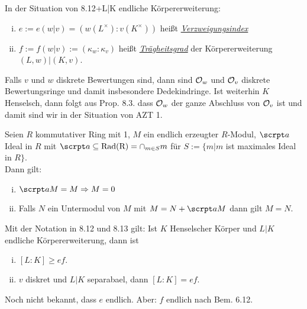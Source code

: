 \begin{defi}
In der Situation von 8.12+L|K endliche Körpererweiterung:
\begin{enumerate}[i)]
\item $e:=e(w|v)=(w(L^\times):v(K^\times))$ heißt \underline{\emph{Verzweigungsindex}}
\item $f:=f(w|v):=(\kappa_w:\kappa_v)$ heißt \underline{\emph{Trägheitsgrad}} der Körpererweiterung $(L,w)|(K,v)$.
\end{enumerate}
\end{defi}

\begin{Bem}
Falls $v$ und $w$ diskrete Bewertungen sind, dann sind $\mathcal{O}_w$ und $\mathcal{O}_v$ diskrete Bewertungsringe und damit insbesondere Dedekindringe. Ist weiterhin $K$ Henselsch, dann folgt aus Prop. 8.3. dass $\mathcal{O}_w$ der ganze Abschluss von $\mathcal{O}_v$ ist und damit sind wir in der Situation von AZT 1.
\end{Bem}

\begin{Fakt}
Seien $R$ kommutativer Ring mit 1, $M$ ein endlich erzeugter $R$-Modul, $\a$ Ideal in $R$ mit $\a \subseteq \mathrm{Rad(R)}=\cap_{m \in S} m$ für $S:=\{m | m  $ ist maximales Ideal in $ R\}$.\\
Dann gilt:
\begin{enumerate}[i)]
\item $\a M=M \Rightarrow M=0$
\item Falls $N$ ein Untermodul von $M$ mit $M=N+\a M$ dann gilt $M=N$.
\end{enumerate}
\end{Fakt}

\begin{Prop}
Mit der Notation in 8.12 und 8.13 gilt: Ist $K$ Henselscher Körper und $L|K$ endliche Körpererweiterung, dann ist
\begin{enumerate}[i)]
\item $[L:K] \geq ef.$
\item $v$ diskret und $L|K$ separabael, dann $[L:K]=ef$.
\end{enumerate}
\danger Noch nicht bekannt, dass $e$ endlich. Aber: $f$ endlich nach Bem. 6.12.
\end{Prop}